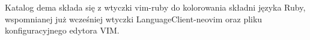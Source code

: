 \documentclass[shortabstract,mgr]{iithesis}
\begin{document}
\begin{appendices}
Katalog dema składa się z wtyczki vim-ruby \cite{VIMRUBY} do kolorowania składni języka Ruby, wspomnianej już wcześniej wtyczki LanguageClient-neovim \cite{LSPCLIENT} oraz pliku konfiguracyjnego edytora VIM.











\end{appendices}


\printbibliography







\end{document}
